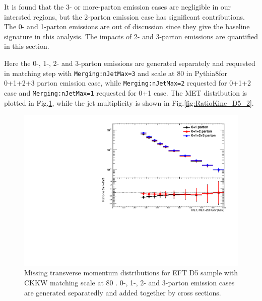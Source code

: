It is found that the 3- or more-parton emission cases are negligible in our intersted regions, but the 2-parton emission case has significant contributions. The 0- and 1-parton emissions are out of discussion since they give the baseline signature in this analysis. The impacts of 2- and 3-parton emissions are quantified in this section.

Here the 0-, 1-, 2- and 3-parton emissions are generated separately and requested in matching step with \texttt{Merging:nJetMax=3} and scale at 80 \gev in Pythia8for 0+1+2+3 parton emission case, while \texttt{Merging:nJetMax=2} requested for 0+1+2 case and \texttt{Merging:nJetMax=1} requested for 0+1 case. The MET distribution is plotted in Fig.\ref{fig:RatioKine_D5}, while the jet multiplicity is shown in Fig.\ref{fig:RatioKine_D5_2}.

\begin{figure}[h!]
	\centering  
	\includegraphics[width=0.8\linewidth]{figures/monojet_appendix/h_MET_MET250.pdf}
	\caption{Missing transverse momentum distributions for EFT D5 sample with CKKW matching scale at 80 \gev. 0-, 1-, 2- and 3-parton emission cases are generated separatedly and added together by cross sections.}
	\label{fig:RatioKine_D5}
\end{figure}


